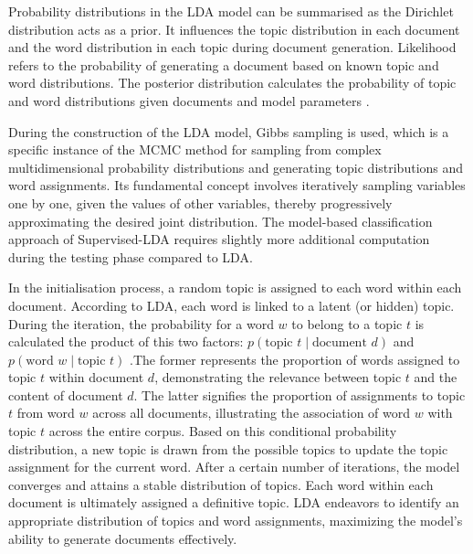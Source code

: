 \documentclass[12pt,twoside]{article}
\begin{document}
Probability distributions in the LDA model can be summarised as the Dirichlet distribution acts as a prior. It influences the topic distribution in each document and the word distribution in each topic during document generation. Likelihood refers to the probability of generating a document based on known topic and word distributions. The posterior distribution calculates the probability of topic and word distributions given documents and model parameters \cite{Naushan2020}. 

During the construction of the LDA model, Gibbs sampling is used, which is a specific instance of the MCMC method for sampling from complex multidimensional probability distributions and generating topic distributions and word assignments. Its fundamental concept involves iteratively sampling variables one by one, given the values of other variables, thereby progressively approximating the desired joint distribution. The model-based classification approach of Supervised-LDA requires slightly more additional computation during the testing phase compared to LDA\cite{Lakshminarayanan2011}.

In the initialisation process, a random topic is assigned to each word within each document. According to LDA, each word is linked to a latent (or hidden) topic. During the iteration, the probability for a word $w$ to belong to a topic $t$ is calculated the product of this two factors: $p(\text{topic } t \mid \text{document } d)$ and $p(\text{word } w \mid \text{topic } t)$ \cite{Kulshrestha2019}.The former represents the proportion of words assigned to topic $t$ within document $d$, demonstrating the relevance between topic $t$ and the content of document $d$. The latter signifies the proportion of assignments to topic $t$ from word $w$ across all documents, illustrating the association of word $w$ with topic $t$ across the entire corpus. Based on this conditional probability distribution, a new topic is drawn from the possible topics to update the topic assignment for the current word. After a certain number of iterations, the model converges and attains a stable distribution of topics. Each word within each document is ultimately assigned a definitive topic. LDA endeavors to identify an appropriate distribution of topics and word assignments, maximizing the model's ability to generate documents effectively.\\\\
\end{document}
